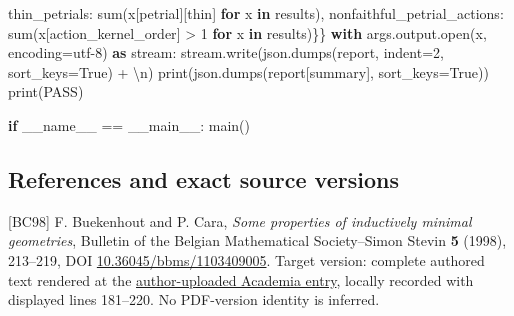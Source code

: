 \documentclass[
  10pt,
  letterpaper,
]{article}
\newenvironment{Shaded}{}{}
\newcommand{\BuiltInTok}[1]{\textcolor[rgb]{0.00,0.50,0.00}{#1}}
\newcommand{\CharTok}[1]{\textcolor[rgb]{0.25,0.44,0.63}{#1}}
\newcommand{\ControlFlowTok}[1]{\textcolor[rgb]{0.00,0.44,0.13}{\textbf{#1}}}
\newcommand{\DecValTok}[1]{\textcolor[rgb]{0.25,0.63,0.44}{#1}}
\newcommand{\ImportTok}[1]{\textcolor[rgb]{0.00,0.50,0.00}{\textbf{#1}}}
\newcommand{\KeywordTok}[1]{\textcolor[rgb]{0.00,0.44,0.13}{\textbf{#1}}}
\newcommand{\NormalTok}[1]{#1}
\newcommand{\OperatorTok}[1]{\textcolor[rgb]{0.40,0.40,0.40}{#1}}
\newcommand{\StringTok}[1]{\textcolor[rgb]{0.25,0.44,0.63}{#1}}
\newcommand{\VariableTok}[1]{\textcolor[rgb]{0.10,0.09,0.49}{#1}}
\begin{document}
\begin{Shaded}
\begin{Highlighting}[]
                 \StringTok{\textquotesingle{}thin\_petrials\textquotesingle{}}\NormalTok{: }\BuiltInTok{sum}\NormalTok{(x[}\StringTok{\textquotesingle{}petrial\textquotesingle{}}\NormalTok{][}\StringTok{\textquotesingle{}thin\textquotesingle{}}\NormalTok{] }\ControlFlowTok{for}\NormalTok{ x }\KeywordTok{in}\NormalTok{ results),}
                 \StringTok{\textquotesingle{}nonfaithful\_petrial\_actions\textquotesingle{}}\NormalTok{: }\BuiltInTok{sum}\NormalTok{(x[}\StringTok{\textquotesingle{}action\_kernel\_order\textquotesingle{}}\NormalTok{] }\OperatorTok{\textgreater{}} \DecValTok{1} \ControlFlowTok{for}\NormalTok{ x }\KeywordTok{in}\NormalTok{ results)\}\}}
    \ControlFlowTok{with}\NormalTok{ args.output.}\BuiltInTok{open}\NormalTok{(}\StringTok{\textquotesingle{}x\textquotesingle{}}\NormalTok{, encoding}\OperatorTok{=}\StringTok{\textquotesingle{}utf{-}8\textquotesingle{}}\NormalTok{) }\ImportTok{as}\NormalTok{ stream:}
\NormalTok{        stream.write(json.dumps(report, indent}\OperatorTok{=}\DecValTok{2}\NormalTok{, sort\_keys}\OperatorTok{=}\VariableTok{True}\NormalTok{) }\OperatorTok{+} \StringTok{\textquotesingle{}}\CharTok{\textbackslash{}n}\StringTok{\textquotesingle{}}\NormalTok{)}
    \BuiltInTok{print}\NormalTok{(json.dumps(report[}\StringTok{\textquotesingle{}summary\textquotesingle{}}\NormalTok{], sort\_keys}\OperatorTok{=}\VariableTok{True}\NormalTok{))}
    \BuiltInTok{print}\NormalTok{(}\StringTok{\textquotesingle{}PASS\textquotesingle{}}\NormalTok{)}


\ControlFlowTok{if} \VariableTok{\_\_name\_\_} \OperatorTok{==} \StringTok{\textquotesingle{}\_\_main\_\_\textquotesingle{}}\NormalTok{:}
\NormalTok{    main()}
\end{Highlighting}
\end{Shaded}

\subsection{References and exact source
versions}\label{references-and-exact-source-versions}

{[}BC98{]} F. Buekenhout and P. Cara, \emph{Some properties of
inductively minimal geometries}, Bulletin of the Belgian Mathematical
Society--Simon Stevin \textbf{5} (1998), 213--219, DOI
\href{https://doi.org/10.36045/bbms/1103409005}{10.36045/bbms/1103409005}.
Target version: complete authored text rendered at the
\href{https://www.academia.edu/54639280/Some_properties_of_inductively_minimal_geometries}{author-uploaded
Academia entry}, locally recorded with displayed lines 181--220. No
PDF-version identity is inferred.
\end{document}
